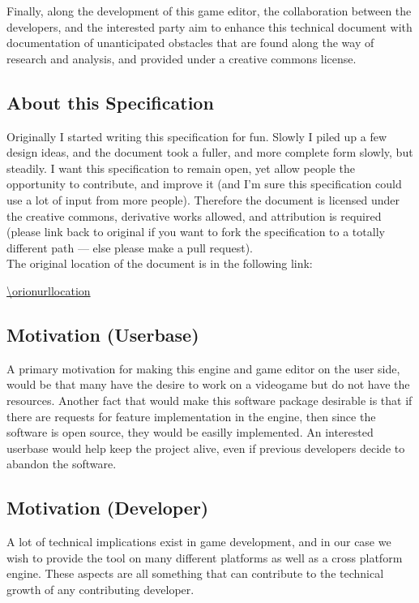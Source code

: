 Finally, along the development of this game editor, the collaboration between
the developers, and the interested party aim to enhance this technical document
with documentation of unanticipated obstacles that are found along the way of
research and analysis, and provided under a creative commons license.

\subsection{About this Specification}

Originally I started writing this specification for fun. Slowly I piled up a few
design ideas, and the document took a fuller, and more complete form slowly, but
steadily. I want this specification to remain open, yet allow people the
opportunity to contribute, and improve it (and I'm sure this specification could
use a lot of input from more people). Therefore the document is licensed under
the creative commons, derivative works allowed, and attribution is required
(please link back to original if you want to fork the specification to a totally
different path --- else please make a pull request).
\\[0.2in]
\noindent The original location of the document is in the following link:

\url{\orionurllocation}

\subsection{Motivation (Userbase)}

A primary motivation for making this engine and game editor on the user side,
would be that many have the desire to work on a videogame but do not have the
resources. Another fact that would make this software package desirable is that
if there are requests for feature implementation in the engine, then since the
software is open source, they would be easilly implemented. An interested
userbase would help keep the project alive, even if previous developers decide
to abandon the software.

\subsection{Motivation (Developer)}

A lot of technical implications exist in game development, and in our case we
wish to provide the tool on many different platforms as well as a cross platform
engine. These aspects are all something that can contribute to the technical
growth of any contributing developer.

